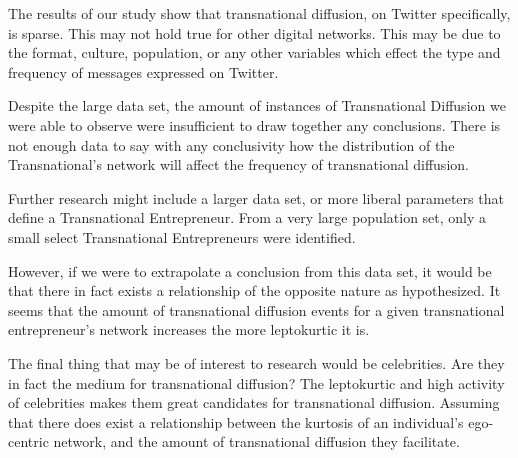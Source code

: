 The results of our study show that transnational diffusion, on Twitter
specifically, is sparse. This may not hold true for other digital
networks. This may be due to the format, culture, population, or any
other variables which effect the type and frequency of messages
expressed on Twitter.

Despite the large data set, the amount of instances of Transnational
Diffusion we were able to observe were insufficient to draw together
any conclusions. There is not enough data to say with any conclusivity
how the distribution of the Transnational's network will affect the
frequency of transnational diffusion.

Further research might include a larger data set, or more liberal
parameters that define a Transnational Entrepreneur. From a very large
population set, only a small select Transnational Entrepreneurs were
identified.

However, if we were to extrapolate a conclusion from this data set, it
would be that there in fact exists a relationship of the opposite
nature as hypothesized. It seems that the amount of transnational
diffusion events for a given transnational entrepreneur's network
increases the more leptokurtic it is.

The final thing that may be of interest to research would be
celebrities. Are they in fact the medium for transnational diffusion?
The leptokurtic and high activity of celebrities makes them great
candidates for transnational diffusion. Assuming that there does exist
a relationship between the kurtosis of an individual's ego-centric
network, and the amount of transnational diffusion they facilitate.